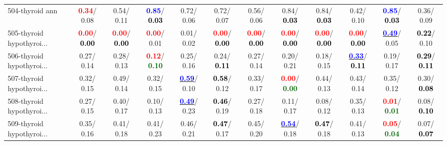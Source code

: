 \begin{table}[h]
\begin{center}
{\begin{tabular}{lc|c|c|c|c|c|c|c|c|c|c}
504-thyroid ann & \textcolor{red}{\textbf{  0.34}}/  0.08 &   0.54/  0.11 & \textcolor{blue}{\textbf{  0.85}}/\textcolor{black}{\textbf{  0.03}} &   0.72/  0.06 &   0.72/  0.07 &   0.56/  0.06 &   0.84/\textcolor{black}{\textbf{  0.03}} &   0.84/\textcolor{black}{\textbf{  0.03}} &   0.42/  0.10 & \textcolor{blue}{\textbf{  0.85}}/\textcolor{black}{\textbf{  0.03}} &   0.36/  0.09 \\
505-thyroid hypothyroi... & \textcolor{red}{\textbf{  0.00}}/\textcolor{black}{\textbf{  0.00}} & \textcolor{red}{\textbf{  0.00}}/\textcolor{black}{\textbf{  0.00}} & \textcolor{red}{\textbf{  0.00}}/  0.01 &   0.01/  0.02 & \textcolor{red}{\textbf{  0.00}}/\textcolor{black}{\textbf{  0.00}} & \textcolor{red}{\textbf{  0.00}}/\textcolor{black}{\textbf{  0.00}} & \textcolor{red}{\textbf{  0.00}}/\textcolor{black}{\textbf{  0.00}} & \textcolor{red}{\textbf{  0.00}}/\textcolor{black}{\textbf{  0.00}} & \textcolor{red}{\textbf{  0.00}}/\textcolor{black}{\textbf{  0.00}} & \underline{\textcolor{blue}{\textbf{  0.49}}}/  0.05 & \textcolor{black}{\textbf{  0.22}}/  0.10 \\
506-thyroid hypothyroi... &   0.27/  0.14 &   0.28/  0.13 & \textcolor{red}{\textbf{  0.12}}/\textcolor{darkgreen}{\textbf{  0.10}} &   0.25/  0.16 &   0.24/\textcolor{black}{\textbf{  0.11}} &   0.27/  0.14 &   0.20/  0.21 &   0.18/  0.15 & \underline{\textcolor{blue}{\textbf{  0.33}}}/\textcolor{black}{\textbf{  0.11}} &   0.19/  0.17 & \textcolor{black}{\textbf{  0.29}}/\textcolor{black}{\textbf{  0.11}} \\
507-thyroid hypothyroi... &   0.32/  0.15 &   0.49/  0.14 &   0.32/  0.15 & \underline{\textcolor{blue}{\textbf{  0.59}}}/  0.10 & \textcolor{black}{\textbf{  0.58}}/  0.12 &   0.33/  0.17 & \textcolor{red}{\textbf{  0.00}}/\textcolor{darkgreen}{\textbf{  0.00}} &   0.44/  0.13 &   0.43/  0.14 &   0.35/  0.12 &   0.30/\textcolor{black}{\textbf{  0.08}} \\
508-thyroid hypothyroi... &   0.27/  0.15 &   0.40/  0.17 &   0.10/  0.13 & \underline{\textcolor{blue}{\textbf{  0.49}}}/  0.23 & \textcolor{black}{\textbf{  0.46}}/  0.19 &   0.27/  0.18 &   0.11/  0.17 &   0.08/  0.12 &   0.35/  0.13 & \textcolor{red}{\textbf{  0.01}}/\textcolor{darkgreen}{\textbf{  0.01}} &   0.08/\textcolor{black}{\textbf{  0.10}} \\ \hline
509-thyroid hypothyroi... &   0.35/  0.16 &   0.41/  0.18 &   0.41/  0.23 &   0.46/  0.21 & \textcolor{black}{\textbf{  0.47}}/  0.17 &   0.45/  0.20 & \underline{\textcolor{blue}{\textbf{  0.54}}}/  0.18 & \textcolor{black}{\textbf{  0.47}}/  0.18 &   0.41/  0.13 & \textcolor{red}{\textbf{  0.05}}/\textcolor{darkgreen}{\textbf{  0.04}} &   0.07/\textcolor{black}{\textbf{  0.07}} \\

\end{tabular}}
\end{center}
\end{table}
